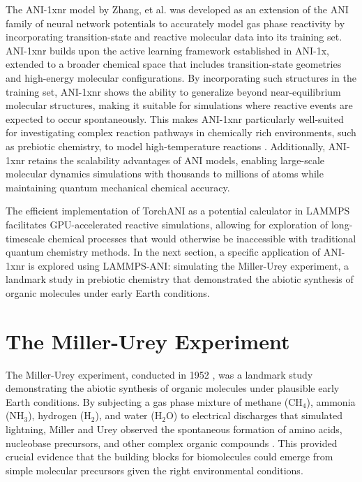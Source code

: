 The ANI-1xnr model by Zhang, et al. \cite{ani-1xnr} was developed as an extension of the ANI family of neural network potentials to accurately model gas phase reactivity by incorporating transition-state and reactive molecular data into its training set.
ANI-1xnr builds upon the active learning framework established in ANI-1x, extended to a broader chemical space that includes transition-state geometries and high-energy molecular configurations. 
By incorporating such structures in the training set, ANI-1xnr shows the ability to generalize beyond near-equilibrium molecular structures, making it suitable for simulations where reactive events are expected to occur spontaneously.
This makes ANI-1xnr particularly well-suited for investigating complex reaction pathways in chemically rich environments, such as prebiotic chemistry, to model high-temperature reactions \cite{ani-1xnr}. 
Additionally, ANI-1xnr retains the scalability advantages of ANI models, enabling large-scale molecular dynamics simulations with thousands to millions of atoms while maintaining quantum mechanical chemical accuracy.

The efficient implementation of TorchANI as a potential calculator in LAMMPS facilitates GPU-accelerated reactive simulations, allowing for exploration of long-timescale chemical processes that would otherwise be inaccessible with traditional quantum chemistry methods.
In the next section, a specific application of ANI-1xnr is explored using LAMMPS-ANI: simulating the Miller-Urey experiment, a landmark study in prebiotic chemistry that demonstrated the abiotic synthesis of organic molecules under early Earth conditions. 

\section{The Miller-Urey Experiment}
\label{sec:miller_experiment}

The Miller-Urey experiment, conducted in 1952 \cite{miller_experiment}, was a landmark study demonstrating the abiotic synthesis of organic molecules under plausible early Earth conditions. 
By subjecting a gas phase mixture of methane ($\text{CH}_4$), ammonia ($\text{NH}_3$), hydrogen ($\text{H}_2$), and water ($\text{H}_2\text{O}$) to electrical discharges that simulated lightning, Miller and Urey observed the spontaneous formation of amino acids, nucleobase precursors, and other complex organic compounds \cite{miller_experiment}. 
This provided crucial evidence that the building blocks for biomolecules could emerge from simple molecular precursors given the right environmental conditions.


